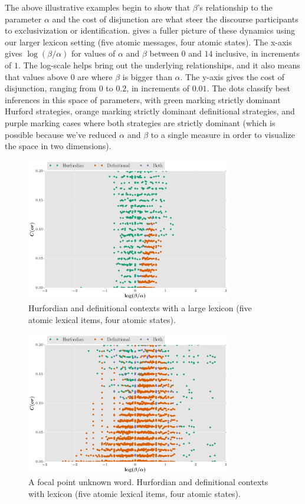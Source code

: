 \documentclass[12pt,twoside]{article}
\renewcommand{\_}{\textbf{\textunderscore\hspace{-4pt}\textunderscore\hspace{-3pt}\textunderscore\hspace{-4pt}\textunderscore}\hspace{0.5pt}}			%
\begin{document}
The above illustrative examples begin to show that $\beta$'s
relationship to the parameter $\alpha$ and the cost of disjunction are
what steer the discourse participants to exclusivization or
identification.  gives a fuller picture of these
dynamics using our larger lexicon setting (five atomic messages, four
atomic states). The x-axis gives $\log(\beta/\alpha)$ for values of
$\alpha$ and $\beta$ between $0$ and $14$ inclusive, in increments of
$1$. The log-scale helps bring out the underlying relationships, and
it also means that values above $0$ are where $\beta$ is bigger than
$\alpha$. The y-axis gives the cost of disjunction, ranging from $0$
to $0.2$, in increments of $0.01$. The dots classify best inferences in
this space of parameters, with green marking strictly dominant Hurford
strategies, orange marking strictly dominant definitional strategies,
and purple marking cases where both strategies are strictly dominant
(which is possible because we've reduced $\alpha$ and $\beta$ to a
single measure in order to visualize the space in two dimensions).

\begin{figure}[tp]
  \centering
  \includegraphics[width=0.8\textwidth]{fig/paramexplore-lex5}
  \caption{Hurfordian and definitional contexts with a large lexicon
    (five atomic lexical items, four atomic states).}
  \label{fig:char}
\end{figure}

\begin{figure}[tp]
  \centering
  \includegraphics[width=0.8\textwidth]{fig/paramexplore-lex5-focal}
  \caption{A focal point unknown word. Hurfordian and definitional
    contexts with lexicon (five atomic lexical items, four atomic
    states).}
  \label{fig:char-focal}
\end{figure}
\end{document}
